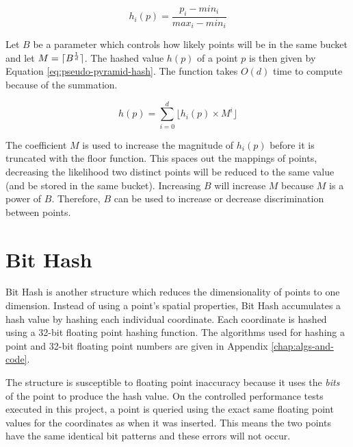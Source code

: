 \begin{equation}
	h_i(p) = \frac{p_i - min_i}{max_i - min_i}
	\label{eq:point-boundary-distance}
\end{equation}

Let $B$ be a parameter which controls how likely points will be in the same bucket and let $M = \lceil B^{\frac{1}{d}}\rceil$. The hashed value $h(p)$ of a point $p$ is then given by Equation \ref{eq:pseudo-pyramid-hash}. The function takes $O(d)$ time to compute because of the summation.

\begin{equation}
	h(p) = \sum_{i = 0}^{d} { \lfloor h_i(p) \times M^{i} \rfloor }
	\label{eq:pseudo-pyramid-hash}
\end{equation}

The coefficient $M$ is used to increase the magnitude of $h_i(p)$ before it is truncated with the floor function. This spaces out the mappings of points, decreasing the likelihood two distinct points will be reduced to the same value (and be stored in the same bucket). Increasing $B$ will increase $M$ because $M$ is a power of $B$. Therefore, $B$ can be used to increase or decrease discrimination between points.

\section{Bit Hash}
\label{sec:bit-hash}


Bit Hash is another structure which reduces the dimensionality of points to one dimension. Instead of using a point's spatial properties, Bit Hash accumulates a hash value by hashing each individual coordinate. Each coordinate is hashed using a  32-bit floating point hashing function. The algorithms used for hashing a point and 32-bit floating point numbers are given in Appendix \ref{chap:algs-and-code}.

The structure is susceptible to floating point inaccuracy because it uses the \textit{bits} of the point to produce the hash value. On the controlled performance tests executed in this project, a point is queried using the exact same floating point values for the coordinates as when it was inserted. This means the two points have the same identical bit patterns and these errors will not occur.

